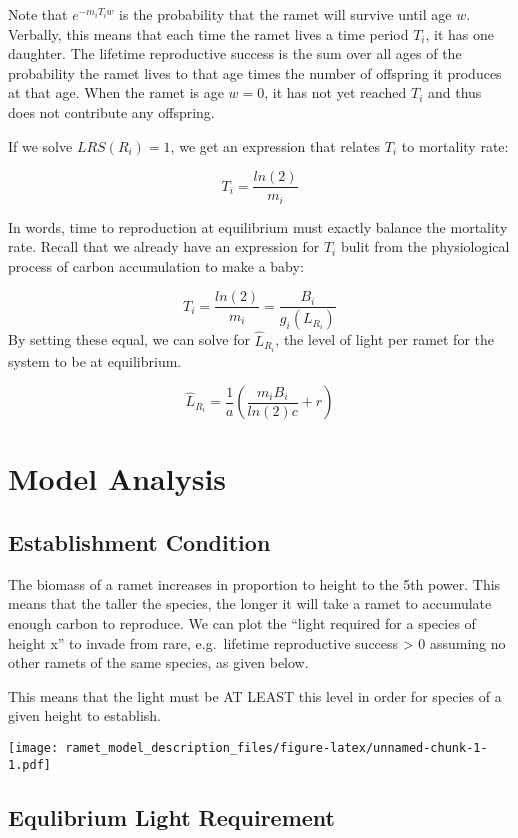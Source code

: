 \documentclass[
]{article}
\begin{document}
Note that \(e^{-m_i T_i w}\) is the probability that the ramet will
survive until age \(w\). Verbally, this means that each time the ramet
lives a time period \(T_i\), it has one daughter. The lifetime
reproductive success is the sum over all ages of the probability the
ramet lives to that age times the number of offspring it produces at
that age. When the ramet is age \(w = 0\), it has not yet reached
\(T_i\) and thus does not contribute any offspring.

If we solve \(LRS(R_i) = 1\), we get an expression that relates \(T_i\)
to mortality rate:

\[T_i = \frac{ln(2)}{m_i}\]

In words, time to reproduction at equilibrium must exactly balance the
mortality rate. Recall that we already have an expression for \(T_i\)
bulit from the physiological process of carbon accumulation to make a
baby:

\[T_i = \frac{ln(2)}{m_i} =  \frac{B_i}{g_i(L_{R_i})} \] By setting
these equal, we can solve for \(\hat L_{R_i}\), the level of light per
ramet for the system to be at equilibrium.

\[\hat L_{R_i} = \frac{1}{a} \left( \frac{m_i B_i}{ln(2) c} + r \right)\]

\section{Model Analysis}\label{model-analysis}

\subsection{Establishment Condition}\label{establishment-condition}

The biomass of a ramet increases in proportion to height to the 5th
power. This means that the taller the species, the longer it will take a
ramet to accumulate enough carbon to reproduce. We can plot the ``light
required for a species of height x'' to invade from rare, e.g.~lifetime
reproductive success \textgreater{} 0 assuming no other ramets of the
same species, as given below.

This means that the light must be AT LEAST this level in order for
species of a given height to establish.

\texttt{[image: ramet\_model\_description\_files/figure-latex/unnamed-chunk-1-1.pdf]}

\subsection{Equlibrium Light
Requirement}\label{equlibrium-light-requirement}
\end{document}
